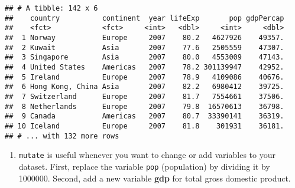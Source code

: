 \documentclass[]{article}
\newenvironment{Shaded}{\begin{snugshade}}{\end{snugshade}}
\newcommand{\KeywordTok}[1]{\textcolor[rgb]{0.13,0.29,0.53}{\textbf{#1}}}
\newcommand{\DataTypeTok}[1]{\textcolor[rgb]{0.13,0.29,0.53}{#1}}
\newcommand{\DecValTok}[1]{\textcolor[rgb]{0.00,0.00,0.81}{#1}}
\newcommand{\StringTok}[1]{\textcolor[rgb]{0.31,0.60,0.02}{#1}}
\newcommand{\CommentTok}[1]{\textcolor[rgb]{0.56,0.35,0.01}{\textit{#1}}}
\newcommand{\OperatorTok}[1]{\textcolor[rgb]{0.81,0.36,0.00}{\textbf{#1}}}
\newcommand{\NormalTok}[1]{#1}
\providecommand{\tightlist}{%
  \setlength{\itemsep}{0pt}\setlength{\parskip}{0pt}}
\begin{document}
\begin{Shaded}
\end{Shaded}

\begin{verbatim}
## # A tibble: 142 x 6
##    country          continent  year lifeExp       pop gdpPercap
##    <fct>            <fct>     <int>   <dbl>     <int>     <dbl>
##  1 Norway           Europe     2007    80.2   4627926    49357.
##  2 Kuwait           Asia       2007    77.6   2505559    47307.
##  3 Singapore        Asia       2007    80.0   4553009    47143.
##  4 United States    Americas   2007    78.2 301139947    42952.
##  5 Ireland          Europe     2007    78.9   4109086    40676.
##  6 Hong Kong, China Asia       2007    82.2   6980412    39725.
##  7 Switzerland      Europe     2007    81.7   7554661    37506.
##  8 Netherlands      Europe     2007    79.8  16570613    36798.
##  9 Canada           Americas   2007    80.7  33390141    36319.
## 10 Iceland          Europe     2007    81.8    301931    36181.
## # ... with 132 more rows
\end{verbatim}

\begin{enumerate}
\def\labelenumi{\arabic{enumi}.}
\setcounter{enumi}{4}
\tightlist
\item
  \texttt{mutate} is useful whenever you want to change or add variables
  to your dataset. First, replace the variable \texttt{pop} (population)
  by dividing it by 1000000. Second, add a new variable \textbf{gdp} for
  total gross domestic product.
\end{enumerate}

\begin{Shaded}
\end{Shaded}
\end{document}
